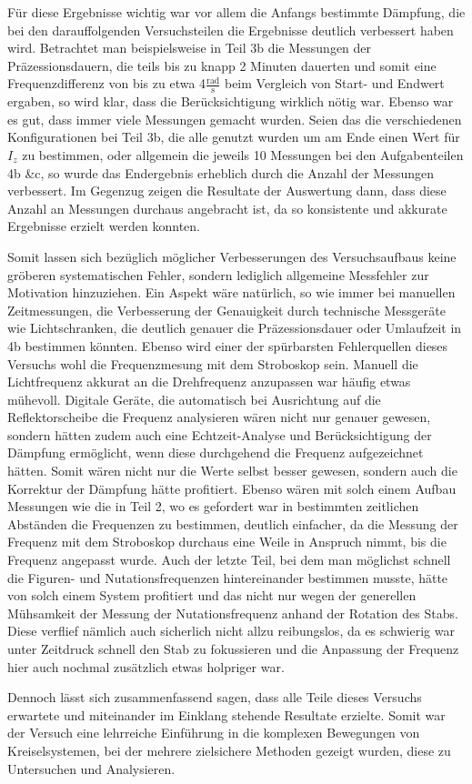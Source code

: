 \documentclass{article}
\begin{document}
Für diese Ergebnisse wichtig war vor allem die Anfangs bestimmte Dämpfung, die bei den darauffolgenden Versuchsteilen die Ergebnisse deutlich verbessert haben wird. Betrachtet man beispielsweise in Teil 3b die Messungen der Präzessionsdauern, die teils bis zu knapp 2 Minuten dauerten und somit eine Frequenzdifferenz von bis zu etwa 4$\frac{\text{rad}}{\text{s}}$ beim Vergleich von Start- und Endwert ergaben, so wird klar, dass die Berücksichtigung wirklich nötig war. Ebenso war es gut, dass immer viele Messungen gemacht wurden. Seien das die verschiedenen Konfigurationen bei Teil 3b, die alle genutzt wurden um am Ende einen Wert für $I_z$ zu bestimmen, oder allgemein die jeweils 10 Messungen bei den Aufgabenteilen 4b \&c, so wurde das Endergebnis erheblich durch die Anzahl der Messungen verbessert. Im Gegenzug zeigen die Resultate der Auswertung dann, dass diese Anzahl an Messungen durchaus angebracht ist, da so konsistente und akkurate Ergebnisse erzielt werden konnten.  

Somit lassen sich bezüglich möglicher Verbesserungen des Versuchsaufbaus keine gröberen systematischen Fehler, sondern lediglich allgemeine Messfehler zur Motivation hinzuziehen. Ein Aspekt wäre natürlich, so wie immer bei manuellen Zeitmessungen, die Verbesserung der Genauigkeit durch technische Messgeräte wie Lichtschranken, die deutlich genauer die Präzessionsdauer oder Umlaufzeit in 4b bestimmen könnten. Ebenso wird einer der spürbarsten Fehlerquellen dieses Versuchs wohl die Frequenzmesung mit dem Stroboskop sein. Manuell die Lichtfrequenz akkurat an die Drehfrequenz anzupassen war häufig etwas mühevoll. Digitale Geräte, die automatisch bei Ausrichtung auf die Reflektorscheibe die Frequenz analysieren wären nicht nur genauer gewesen, sondern hätten zudem auch eine Echtzeit-Analyse und Berücksichtigung der Dämpfung ermöglicht, wenn diese durchgehend die Frequenz aufgezeichnet hätten. Somit wären nicht nur die Werte selbst besser gewesen, sondern auch die Korrektur der Dämpfung hätte profitiert. Ebenso wären mit solch einem Aufbau Messungen wie die in Teil 2, wo es gefordert war in bestimmten zeitlichen Abständen die Frequenzen zu bestimmen, deutlich einfacher, da die Messung der Frequenz mit dem Stroboskop durchaus eine Weile in Anspruch nimmt, bis die Frequenz angepasst wurde. Auch der letzte Teil, bei dem man möglichst schnell die Figuren- und Nutationsfrequenzen hintereinander bestimmen musste, hätte von solch einem System profitiert und das nicht nur wegen der generellen Mühsamkeit der Messung der Nutationsfrequenz anhand der Rotation des Stabs. Diese verflief nämlich auch sicherlich nicht allzu reibungslos, da es schwierig war unter Zeitdruck schnell den Stab zu fokussieren und die Anpassung der Frequenz hier auch nochmal zusätzlich etwas holpriger war. 

Dennoch lässt sich zusammenfassend sagen, dass alle Teile dieses Versuchs erwartete und miteinander im Einklang stehende Resultate erzielte. Somit war der Versuch eine lehrreiche Einführung in die komplexen Bewegungen von Kreiselsystemen, bei der mehrere zielsichere Methoden gezeigt wurden, diese zu Untersuchen und Analysieren.  

\newpage

\end{document}
